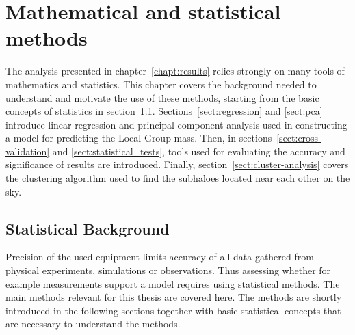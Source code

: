 \documentclass[english, oneside]{HYgradu}
\begin{document}
\chapter{Mathematical and statistical methods}
The analysis presented in chapter~\ref{chapt:results} relies strongly on many tools of mathematics and statistics. This chapter covers the background needed to understand and motivate the use of these methods, starting from the basic concepts of statistics in section~\ref{sect:statistical-background}. Sections~\ref{sect:regression} and \ref{sect:pca} introduce linear regression and principal component analysis used in constructing a model for predicting the Local Group mass. Then, in sections~\ref{sect:cross-validation} and \ref{sect:statistical_tests}, tools used for evaluating the accuracy and significance of results are introduced. Finally, section~\ref{sect:cluster-analysis} covers the clustering algorithm used to find the subhaloes located near each other on the sky.


\section{Statistical Background} \label{sect:statistical-background}

Precision of the used equipment limits accuracy of all data gathered from physical experiments, simulations or observations. Thus assessing whether for example measurements support a model requires using statistical methods. The main methods relevant for this thesis are covered here. The methods are shortly introduced in the following sections together with basic statistical concepts that are necessary to understand the methods. 

\end{document}
